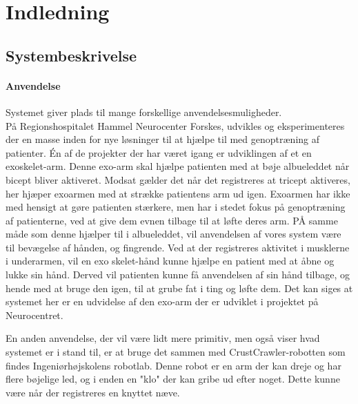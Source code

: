 \thispagestyle{fancy}
\chapter{Indledning}
\label{chp:indledning}

\section{Systembeskrivelse}
\subsubsection{Anvendelse}
Systemet giver plads til mange forskellige anvendelsesmuligheder.\\

På Regionshospitalet Hammel Neurocenter Forskes, udvikles og eksperimenteres der en masse inden for nye løsninger til at hjælpe til med genoptræning af patienter. Én af de projekter der har været igang er udviklingen af et en exoskelet-arm. Denne exo-arm skal hjælpe patienten med at bøje albueleddet når bicept bliver aktiveret. Modsat gælder det når det registreres at tricept aktiveres, her hjæper exoarmen med at strække patientens arm ud igen. Exoarmen har ikke med hensigt at gøre patienten stærkere, men har i stedet fokus på genoptræning af patienterne, ved at give dem evnen tilbage til at løfte deres arm. PÅ samme måde som denne hjælper til i albueleddet, vil anvendelsen af vores system være til bevægelse af hånden, og fingrende. Ved at der registreres aktivitet i musklerne i underarmen, vil en exo skelet-hånd kunne hjælpe en patient med at åbne og lukke sin hånd. Derved vil patienten kunne få anvendelsen af sin hånd tilbage, og hende med at bruge den igen, til at grube fat i ting og løfte dem. Det kan siges at systemet her er en udvidelse af den exo-arm der er udviklet i projektet på Neurocentret.

En anden anvendelse, der vil være lidt mere primitiv, men også viser hvad systemet er i stand til, er at bruge det sammen med CrustCrawler-robotten som findes Ingeniørhøjskolens robotlab. Denne robot er en arm der kan dreje og har flere bøjelige led, og i enden en "klo" der kan gribe ud efter noget. Dette kunne være når der registreres en knyttet næve.